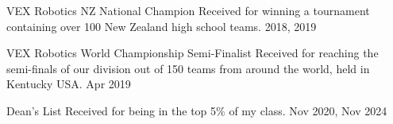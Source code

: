 
\begin{cvhonors}
	\cvhonor
	{VEX Robotics NZ National Champion}
	{Received for winning a tournament containing over 100 New Zealand high school teams.}
	{}
	{2018, 2019}


	\cvhonor
	{VEX Robotics World Championship Semi-Finalist}
	{Received for reaching the semi-finals of our division out of 150 teams from around the world, held in Kentucky USA.}
	{}
	{Apr 2019}

	\cvhonor
	{Dean's List}
	{Received for being in the top 5\% of my class.}
	{}
	{Nov 2020, Nov 2024}
\end{cvhonors}
